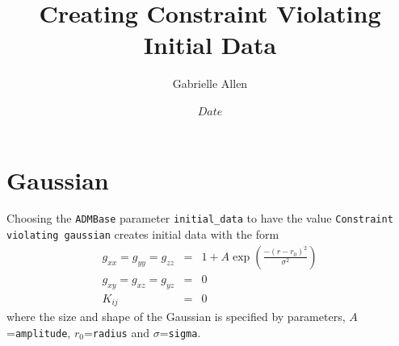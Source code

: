 \documentclass{article}
\begin{document}
\title{Creating Constraint Violating Initial Data}
\author{Gabrielle Allen}
\date{$Date$}

\maketitle



\section{Gaussian}

Choosing the {\tt ADMBase} parameter {\tt initial\_data} to have the 
value {\tt Constraint violating gaussian} creates initial data with the
form
\begin{eqnarray*}
g_{xx} = g_{yy} = g_{zz} &=& 1 + A \exp \left(\frac{-(r-r_0)^2}{\sigma^2}\right)
\\
g_{xy} = g_{xz} = g_{yz} &=& 0
\\
K_{ij} &=& 0
\end{eqnarray*}
where the size and shape of the Gaussian is specified by parameters, $A$={\tt amplitude}, $r_0$={\tt radius} and $\sigma$={\tt sigma}.
\end{document}
